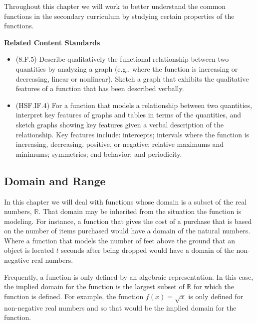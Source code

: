 \documentclass[
]{book}
\providecommand{\tightlist}{%
  \setlength{\itemsep}{0pt}\setlength{\parskip}{0pt}}
\newenvironment{standards}{}{}
\theoremstyle{definition}
\theoremstyle{definition}
\theoremstyle{definition}
\theoremstyle{definition}
\theoremstyle{remark}
\begin{document}
Throughout this chapter we will work to better understand the common functions in the secondary curriculum by studying certain properties of the functions.

\begin{standards}

\begin{center}
\textbf{Related Content Standards}

\end{center}

\begin{itemize}
\tightlist
\item
  (8.F.5) Describe qualitatively the functional relationship between two quantities by analyzing a graph (e.g., where the function is increasing or decreasing, linear or nonlinear). Sketch a graph that exhibits the qualitative features of a function that has been described verbally.
\item
  (HSF.IF.4) For a function that models a relationship between two quantities, interpret key features of graphs and tables in terms of the quantities, and sketch graphs showing key features given a verbal description of the relationship. Key features include: intercepts; intervals where the function is increasing, decreasing, positive, or negative; relative maximums and minimums; symmetries; end behavior; and periodicity.
\end{itemize}

\end{standards}

\hypertarget{domain-and-range}{%
\subsection{Domain and Range}\label{domain-and-range}}

In this chapter we will deal with functions whose domain is a subset of the real numbers, \(\mathbb{R}\). That domain may be inherited from the situation the function is modeling. For instance, a function that gives the cost of a purchase that is based on the number of items purchased would have a domain of the natural numbers. Where a function that models the number of feet above the ground that an object is located \(t\) seconds after being dropped would have a domain of the non-negative real numbers.

Frequently, a function is only defined by an algebraic representation. In this case, the implied domain for the function is the largest subset of \(\mathbb{R}\) for which the function is defined. For example, the function \(f(x)=\sqrt{x}\) is only defined for non-negative real numbers and so that would be the implied domain for the function.
\end{document}
